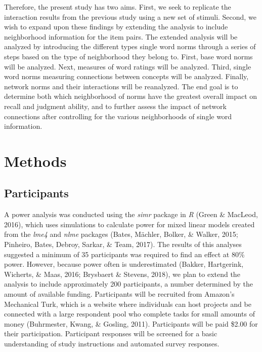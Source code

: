\documentclass[english,man]{apa6}
\theoremstyle{definition}
\theoremstyle{definition}
\theoremstyle{definition}
\theoremstyle{remark}
\begin{document}
Therefore, the present study has two aims. First, we seek to replicate
the interaction results from the previous study using a new set of
stimuli. Second, we wish to expand upon these findings by extending the
analysis to include neighborhood information for the item pairs. The
extended analysis will be analyzed by introducing the different types
single word norms through a series of steps based on the type of
neighborhood they belong to. First, base word norms will be analyzed.
Next, measures of word ratings will be analyzed. Third, single word
norms measuring connections between concepts will be analyzed. Finally,
network norms and their interactions will be reanalyzed. The end goal is
to determine both which neighborhood of norms have the greatest overall
impact on recall and judgment ability, and to further assess the impact
of network connections after controlling for the various neighborhoods
of single word information.

\section{Methods}\label{methods}

\subsection{Participants}\label{participants}

A power analysis was conducted using the \emph{simr} package in \emph{R}
(Green \& MacLeod, 2016), which uses simulations to calculate power for
mixed linear models created from the \emph{lme4} and \emph{nlme}
packages (Bates, Mächler, Bolker, \& Walker, 2015; Pinheiro, Bates,
Debroy, Sarkar, \& Team, 2017). The results of this analyses suggested a
minimum of 35 participants was required to find an effect at 80\% power.
However, because power often is underestimated (Bakker, Hartgerink,
Wicherts, \& Maas, 2016; Brysbaert \& Stevens, 2018), we plan to extend
the analysis to include approximately 200 participants, a number
determined by the amount of available funding. Participants will be
recruited from Amazon's Mechanical Turk, which is a website where
individuals can host projects and be connected with a large respondent
pool who complete tasks for small amounts of money (Buhrmester, Kwang,
\& Gosling, 2011). Participants will be paid \$2.00 for their
participation. Participant responses will be screened for a basic
understanding of study instructions and automated survey responses.
\end{document}
